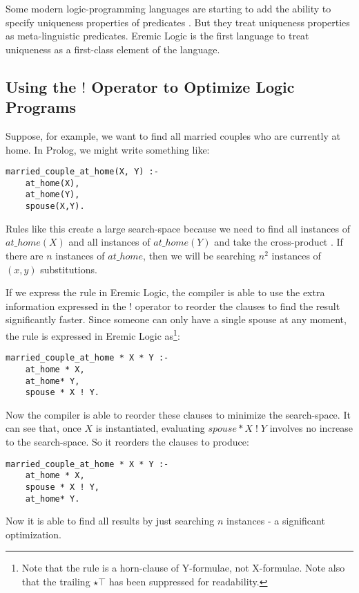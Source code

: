 Some modern logic-programming languages are starting to add the ability to specify uniqueness properties of predicates \cite{mercury}. 
But they treat uniqueness properties as meta-linguistic predicates. 
Eremic Logic is the first language to treat uniqueness as a first-class element of the language.

\subsection{Using the $!$ Operator to Optimize Logic Programs}
Suppose, for example, we want to find all married couples who are currently at home.
In Prolog, we might write something like:
\begin{verbatim}
married_couple_at_home(X, Y) :-
    at_home(X),
    at_home(Y),
    spouse(X,Y).
\end{verbatim}	
Rules like this create a large search-space because we need to find all instances of $at\_home(X)$ and all instances of  $at\_home(Y)$ and take the cross-product \cite{smith-and-genesereth}. If there are $n$ instances of $at\_home$, then we will be searching $n^2$ instances of $(x,y)$ substitutions.

If we express the rule in Eremic Logic, the compiler is able to use the extra information expressed in the $!$ operator to reorder the clauses to find the result significantly faster.
Since someone can only have a single spouse at any moment, the rule is expressed in Eremic Logic as\footnote{Note that the rule is a horn-clause of Y-formulae, not X-formulae. Note also that the trailing $\star \top$ has been suppressed for readability.}:
\begin{verbatim}
married_couple_at_home * X * Y :-
    at_home * X,
    at_home* Y,
    spouse * X ! Y.
\end{verbatim}	
Now the compiler is able to reorder these clauses to minimize the search-space. 
It can see that, once $X$ is instantiated, evaluating $spouse * X \; ! \; Y$ involves no increase to the search-space.
So it reorders the clauses to produce:
\begin{verbatim}
married_couple_at_home * X * Y :-
    at_home * X,
    spouse * X ! Y,
    at_home* Y.
\end{verbatim}	
Now it is able to find all results by just searching $n$ instances - a significant optimization.

